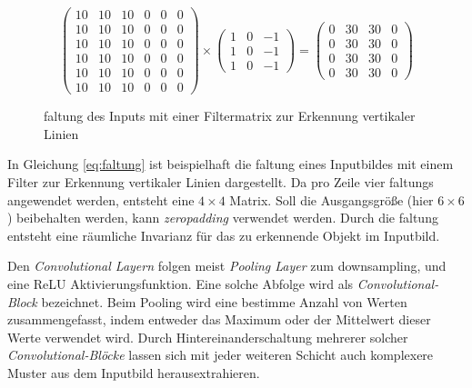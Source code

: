 \begin{equation}
    \label{eq:faltung}
    \begin{pmatrix}
        10 & 10 & 10 & 0 & 0 & 0\\
        10 & 10 & 10 & 0 & 0 & 0\\
        10 & 10 & 10 & 0 & 0 & 0\\
        10 & 10 & 10 & 0 & 0 & 0\\
        10 & 10 & 10 & 0 & 0 & 0\\
        10 & 10 & 10 & 0 & 0 & 0
    \end{pmatrix}
    \times
    \begin{pmatrix}
        1 & 0 & -1\\
        1 & 0 & -1\\
        1 & 0 & -1
    \end{pmatrix}
    = 
    \begin{pmatrix}
        0 & 30 & 30 & 0\\
        0 & 30 & 30 & 0\\
        0 & 30 & 30 & 0\\
        0 & 30 & 30 & 0
    \end{pmatrix}
\end{equation}
\vspace{0.5cm}
\begin{figure}[H]
    \centering
    \def\svgwidth{0.6\textwidth}
    
    \caption{\Gls{faltung} des Inputs mit einer
    Filtermatrix zur Erkennung vertikaler Linien}
    \label{fig:faltung3}
\end{figure}

In Gleichung \ref{eq:faltung} ist beispielhaft die \Gls{faltung} 
eines Inputbildes mit einem Filter zur Erkennung 
vertikaler Linien dargestellt. Da pro Zeile 
vier \Glspl{faltung} angewendet werden, entsteht 
eine $4\times4$ Matrix. Soll die Ausgangsgröße 
(hier $6\times6$) beibehalten werden, kann
\textit{\Gls{zeropadding}} verwendet werden.
Durch die \Gls{faltung} entsteht eine räumliche 
Invarianz für das zu erkennende Objekt im 
Inputbild.

Den \textit{Convolutional Layern} folgen meist
\textit{Pooling Layer} zum \Gls{downsampling},
und eine ReLU Aktivierungsfunktion. Eine solche 
Abfolge wird als \textit{Convolutional-Block}
bezeichnet.
Beim Pooling wird eine bestimme Anzahl von Werten 
zusammengefasst, indem entweder das Maximum oder der 
Mittelwert dieser Werte verwendet wird.
Durch Hintereinanderschaltung mehrerer solcher
\textit{Convolutional-Blöcke} lassen sich
mit jeder weiteren Schicht auch komplexere 
Muster aus dem Inputbild herausextrahieren.

